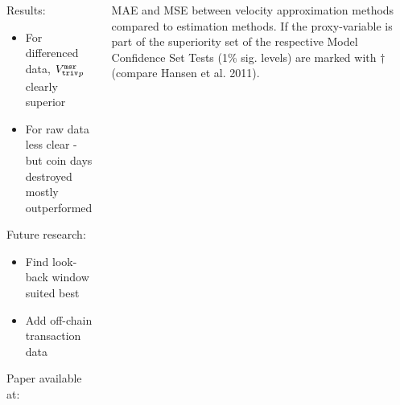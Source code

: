 \documentclass[final,hyperref={pdfpagelabels=false}]{beamer}
\begin{document}
\begin{frame}[t]
\begin{columns}
\begin{column}{.9\textwidth}
\begin{columns}[c]
  \begin{center}
    \begin{block}{Results:}
      \begin{itemize}
      \item For differenced data, \({{V_{\mathtt{triv}}^{\mathtt{msr}}}_{p}}\) clearly superior
      \item For raw data less clear - but coin days destroyed mostly outperformed
      \end{itemize}
    \end{block}
    \begin{block}{Future research:}
      \begin{itemize}
      \item Find look-back window suited best
      \item Add off-chain transaction data
      \end{itemize}
    \end{block}
    \begin{block}{Paper available at:}
    \end{block}
  \end{center}
  \begin{center}
    \begin{table}
      \caption{MAE and MSE between velocity approximation methods compared to estimation methods. If the proxy-variable is part of the superiority set of the respective Model Confidence Set Tests (1\% sig. levels) are marked with \(\dag\) (compare Hansen et al. 2011).
      }
      \label{tbl: errortable1}
    \end{table}
    \vspace{-4mm}
  \end{center}
\end{columns}

\end{column}
\end{columns}
\end{frame}
\end{document}
